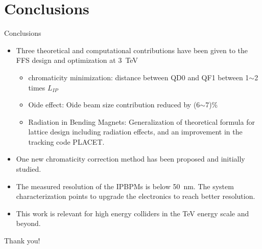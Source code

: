 \documentclass{beamer}
\begin{document}
\section{Conclusions}
\begin{frame}{Conclusions}
\scriptsize
 \begin{itemize}
  \item Three theoretical and computational contributions have been given to the FFS design and optimization at 3~TeV
  \begin{itemize}\scriptsize
  \item chromaticity minimization: distance between QD0 and QF1 between 1$\sim$2 times $L_{IP}$
  \item Oide effect: Oide beam size contribution reduced by (6$\sim$7)\%
  \item Radiation in Bending Magnets: Generalization of theoretical formula for lattice design including radiation effects, and an improvement in the tracking code PLACET.
  \end{itemize}
  \item One new chromaticity correction method has been proposed and initially studied.
  \item The measured resolution of the IPBPMs is below 50~nm. The system characterization points to upgrade the electronics to reach better resolution.
  \item This work is relevant for high energy colliders in the TeV energy scale and beyond.
 \end{itemize}
 Thank you!%
\end{frame}
\end{document}

